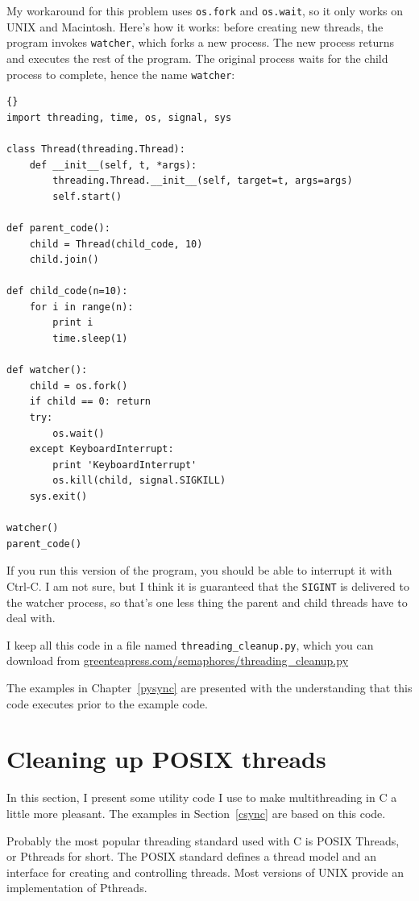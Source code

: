 \documentclass{book}
\begin{document}
My workaround for this problem uses {\tt os.fork} and {\tt os.wait},
so it only works on UNIX and Macintosh.  Here's how it works:
before creating new threads, the program invokes {\tt watcher},
which forks a new process.  The new process returns and executes
the rest of the program.  The original process waits for the
child process to complete, hence the name {\tt watcher}:

\begin{lstlisting}[title={The watcher}]{}
import threading, time, os, signal, sys

class Thread(threading.Thread):
    def __init__(self, t, *args):
        threading.Thread.__init__(self, target=t, args=args)
        self.start()

def parent_code():
    child = Thread(child_code, 10)
    child.join()

def child_code(n=10):
    for i in range(n):
        print i
        time.sleep(1)

def watcher():
    child = os.fork()
    if child == 0: return
    try:
        os.wait()
    except KeyboardInterrupt:
        print 'KeyboardInterrupt'
        os.kill(child, signal.SIGKILL)
    sys.exit()

watcher()
parent_code()
\end{lstlisting}

If you run this version of the program, you should be able
to interrupt it with Ctrl-C.  I am not sure, but I think it
is guaranteed that the {\tt SIGINT} is delivered to the
watcher process, so that's one less thing the
parent and child threads have to deal with.

I keep all this code in a file named {\tt threading\_cleanup.py},
which you can download from
\url{greenteapress.com/semaphores/threading\_cleanup.py}


The examples in Chapter~\ref{pysync} are presented with the understanding
that this code executes prior to the example code.


\chapter{Cleaning up POSIX threads}
\label{ccleanup}

In this section, I present some utility code I use to make
multithreading in C a little more pleasant.  The examples in
Section~\ref{csync} are based on this code.

Probably the most popular threading standard used with C is
POSIX Threads, or Pthreads for short.  The POSIX standard defines
a thread model and an interface for creating and controlling
threads.  Most versions of UNIX provide an implementation of
Pthreads.
\end{document}
